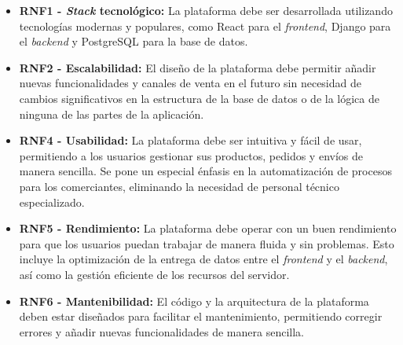 \begin{itemize}
    \item \textbf{RNF1 - \textit{Stack} tecnológico:} La plataforma debe ser desarrollada utilizando tecnologías modernas y populares, como React para el \textit{frontend}, Django para el \textit{backend} y PostgreSQL para la base de datos.
    \item \textbf{RNF2 - Escalabilidad:} El diseño de la plataforma debe permitir añadir nuevas funcionalidades y canales de venta en el futuro sin necesidad de cambios significativos en la estructura de la base de datos o de la lógica de ninguna de las partes de la aplicación.
    \item \textbf{RNF4 - Usabilidad:} La plataforma debe ser intuitiva y fácil de usar, permitiendo a los usuarios gestionar sus productos, pedidos y envíos de manera sencilla. Se pone un especial énfasis en la automatización de procesos para los comerciantes, eliminando la necesidad de personal técnico especializado.
    \item \textbf{RNF5 - Rendimiento:}  La plataforma debe operar con un buen rendimiento para que los usuarios puedan trabajar de manera fluida y sin problemas. Esto incluye la optimización de la entrega de datos entre el \textit{frontend} y el \textit{backend}, así como la gestión eficiente de los recursos del servidor.
    \item \textbf{RNF6 - Mantenibilidad:} El código y la arquitectura de la plataforma deben estar diseñados para facilitar el mantenimiento, permitiendo corregir errores y añadir nuevas funcionalidades de manera sencilla.
\end{itemize}